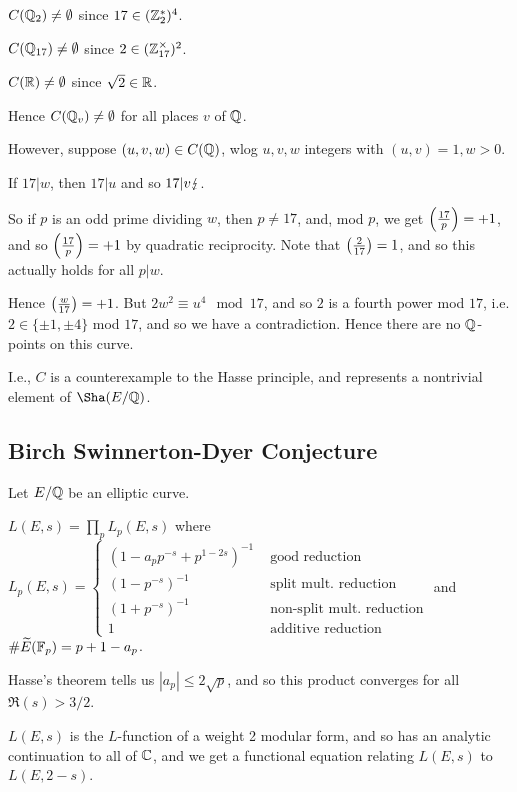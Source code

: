 \documentclass[10pt,a4paper]{article}
\begin{document}
$C(\mathbb{Q}_2) \neq \emptyset$ since $17 \in (\mathbb{Z}_2^\ast)^4$.

$C(\mathbb{Q}_{17})\neq \emptyset$ since $2 \in (\mathbb{Z}_{17}^\times)^2$.

$C(\mathbb{R}) \neq \emptyset$ since $\sqrt{2}\in \mathbb{R}$.

Hence $C(\mathbb{Q}_v) \neq \emptyset$ for all places $v$ of $\mathbb{Q}$.

However, suppose $(u,v,w) \in C(\mathbb{Q})$, wlog $u,v,w$ integers with $(u,v) = 1, w > 0$.

If $17|w$, then $17|u$ and so $17|v \lightning$.

So if $p$ is an odd prime dividing $w$, then $p \neq 17$, and, mod $p$, we get $\left(\frac{17}{p}\right) = +1$, and so $\left(\frac{17}{p}\right) = +1$ by quadratic reciprocity. Note that $\left(\frac{2}{17}\right) = 1$, and so this actually holds for all $p|w$.

Hence $\left(\frac{w}{17}\right) = +1$. But $2w^2 \equiv u^4 \mod 17$, and so $2$ is a fourth power mod $17$, i.e. $2 \in \{\pm 1, \pm 4\}$ mod $17$, and so we have a contradiction. Hence there are no $\mathbb{Q}$-points on this curve.

I.e., $C$ is a counterexample to the Hasse principle, and represents a nontrivial element of $\Sha(E/\Q)$.

\subsection{Birch Swinnerton-Dyer Conjecture}
Let $E/\mathbb{Q}$ be an elliptic curve.
\begin{definition}
  $L(E,s) = \prod_p L_p(E,s)$ where $L_p(E,s) = \begin{cases}(1-a_p p^{-s} + p^{1-2s})^{-1} & \text{ good reduction}\\ (1-p^{-s})^{-1} & \text{ split mult. reduction}\\ (1+p^{-s})^{-1} & \text{ non-split mult. reduction}\\ 1 & \text{ additive reduction}\end{cases}$ and $\#\widetilde{E}(\mathbb{F}_p) = p+1-a_p$.
\end{definition}
Hasse's theorem tells us $|a_p| \leq 2\sqrt{p}$, and so this product converges for all $\Re(s) > 3/2$.

\begin{theorem}
  $L(E,s)$ is the $L$-function of a weight 2 modular form, and so has an analytic continuation to all of $\mathbb{C}$, and we get a functional equation relating $L(E,s)$ to $L(E,2-s)$.
\end{theorem}
\end{document}
